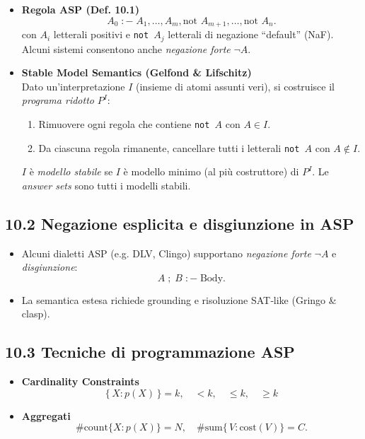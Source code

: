 \documentclass[12pt]{article}
\begin{document}
\begin{itemize}
  \item \textbf{Regola ASP (Def. 10.1)}
    \[
      A_0 \; :- \; A_1, \dots, A_m, \text{not } A_{m+1}, \dots, \text{not } A_n.
    \]
    con $A_i$ letterali positivi e \texttt{not $A_j$} letterali di negazione “default” (NaF). Alcuni sistemi consentono anche \emph{negazione forte} $\neg A$.

  \item \textbf{Stable Model Semantics (Gelfond \& Lifschitz)}\\
    Dato un’interpretazione $I$ (insieme di atomi assunti veri), si costruisce il \emph{programa ridotto} $P^I$:
    \begin{enumerate}
      \item Rimuovere ogni regola che contiene \texttt{not $A$} con $A \in I$.
      \item Da ciascuna regola rimanente, cancellare tutti i letterali \texttt{not $A$} con $A \notin I$.
    \end{enumerate}
    $I$ è \emph{modello stabile} se $I$ è modello minimo (al più costruttore) di $P^I$. Le \emph{answer sets} sono tutti i modelli stabili.
\end{itemize}

\subsection*{10.2 Negazione esplicita e disgiunzione in ASP}

\begin{itemize}
  \item Alcuni dialetti ASP (e.g. DLV, Clingo) supportano \emph{negazione forte} $\neg A$ e \emph{disgiunzione}:
    \[
      A \; ; \; B \; :- \; \mathrm{Body}.
    \]
  \item La semantica estesa richiede grounding e risoluzione SAT‐like (Gringo \& clasp).
\end{itemize}

\subsection*{10.3 Tecniche di programmazione ASP}

\begin{itemize}
  \item \textbf{Cardinality Constraints}\\
    \[
      \{\, X : p(X)\,\} = k,\quad <k,\quad \leq k,\quad \geq k
    \]
  \item \textbf{Aggregati}\\
    \[
      \#\mathrm{count}\{X : p(X)\} = N,\quad
      \#\mathrm{sum}\{\, V : \mathrm{cost}(V)\} = C.
    \]
\end{itemize}
\end{document}
